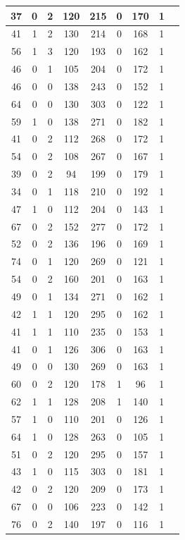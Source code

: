 \documentclass{article}
\begin{document}
\begin{longtable}{
|
c|c|c|c|c|c|c|c|c|}
\hline
37 & 0 & 2 & 120 & 215 & 0 & 170 & 1 \\
\hline
41 & 1 & 2 & 130 & 214 & 0 & 168 & 1 \\
\hline
56 & 1 & 3 & 120 & 193 & 0 & 162 & 1 \\
\hline
46 & 0 & 1 & 105 & 204 & 0 & 172 & 1 \\
\hline
46 & 0 & 0 & 138 & 243 & 0 & 152 & 1 \\
\hline
64 & 0 & 0 & 130 & 303 & 0 & 122 & 1 \\
\hline
59 & 1 & 0 & 138 & 271 & 0 & 182 & 1 \\
\hline
41 & 0 & 2 & 112 & 268 & 0 & 172 & 1 \\
\hline
54 & 0 & 2 & 108 & 267 & 0 & 167 & 1 \\
\hline
39 & 0 & 2 & 94 & 199 & 0 & 179 & 1 \\
\hline
34 & 0 & 1 & 118 & 210 & 0 & 192 & 1 \\
\hline
47 & 1 & 0 & 112 & 204 & 0 & 143 & 1 \\
\hline
67 & 0 & 2 & 152 & 277 & 0 & 172 & 1 \\
\hline
52 & 0 & 2 & 136 & 196 & 0 & 169 & 1 \\
\hline
74 & 0 & 1 & 120 & 269 & 0 & 121 & 1 \\
\hline
54 & 0 & 2 & 160 & 201 & 0 & 163 & 1 \\
\hline
49 & 0 & 1 & 134 & 271 & 0 & 162 & 1 \\
\hline
42 & 1 & 1 & 120 & 295 & 0 & 162 & 1 \\
\hline
41 & 1 & 1 & 110 & 235 & 0 & 153 & 1 \\
\hline
41 & 0 & 1 & 126 & 306 & 0 & 163 & 1 \\
\hline
49 & 0 & 0 & 130 & 269 & 0 & 163 & 1 \\
\hline
60 & 0 & 2 & 120 & 178 & 1 & 96 & 1 \\
\hline
62 & 1 & 1 & 128 & 208 & 1 & 140 & 1 \\
\hline
57 & 1 & 0 & 110 & 201 & 0 & 126 & 1 \\
\hline
64 & 1 & 0 & 128 & 263 & 0 & 105 & 1 \\
\hline
51 & 0 & 2 & 120 & 295 & 0 & 157 & 1 \\
\hline
43 & 1 & 0 & 115 & 303 & 0 & 181 & 1 \\
\hline
42 & 0 & 2 & 120 & 209 & 0 & 173 & 1 \\
\hline
67 & 0 & 0 & 106 & 223 & 0 & 142 & 1 \\
\hline
76 & 0 & 2 & 140 & 197 & 0 & 116 & 1 \\

\end{longtable}
\end{document}
